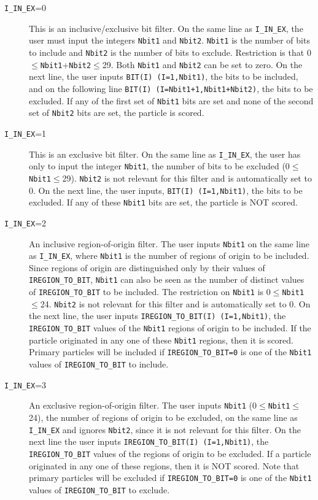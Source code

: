 \documentclass[12pt,twoside]{article}
\begin{document}
\begin{description}
\item [{\tt I\_IN\_EX}=0] This is an inclusive/exclusive bit filter.  On the
same line as {\tt I\_IN\_EX}, the user must input the integers {\tt Nbit1} and
{\tt Nbit2}.  {\tt Nbit1} is the number of bits to include and {\tt Nbit2} is
the number of bits to exclude.  Restriction is that
0$\leq${\tt Nbit1}+{\tt Nbit2}$\leq$29.
Both {\tt Nbit1} and {\tt Nbit2} can be set to zero.  On the next line, the
user inputs {\tt BIT(I) (I=1,Nbit1)}, the bits to be included, and on
the following line {\tt BIT(I) (I=Nbit1+1,Nbit1+Nbit2)}, the bits to
be excluded.  If any of the first set of {\tt Nbit1} bits are set and none
of the second set of {\tt Nbit2} bits are set, the particle is scored.

\item [{\tt I\_IN\_EX}=1] This is an exclusive bit filter.  On the same line
as {\tt I\_IN\_EX}, the user has only to input the integer {\tt Nbit1}, the
number of bits to be excluded (0$\leq${\tt Nbit1}$\leq$29).  {\tt Nbit2} is
not relevant for this filter and is automatically set to 0.  On the
next line, the user inputs, {\tt BIT(I) (I=1,Nbit1)}, the bits to
be excluded.  If any of these {\tt Nbit1} bits are set, the particle
is NOT scored.

\item [{\tt I\_IN\_EX}=2] An inclusive region-of-origin filter.
The user inputs {\tt Nbit1} on the same line
as {\tt I\_IN\_EX}, where {\tt Nbit1} is the number of regions of origin
to be included.  Since regions of origin are distinguished only by their
values of {\tt IREGION\_TO\_BIT}, {\tt Nbit1} can also be seen as the
number of distinct values of {\tt IREGION\_TO\_BIT} to be included. The
restriction on {\tt Nbit1} is 0$\leq${\tt Nbit1}$\leq$24.  {\tt Nbit2} is
not relevant for this filter and is automatically set to 0.  On the
next line, the user inputs {\tt IREGION\_TO\_BIT(I) (I=1,Nbit1)}, the
{\tt IREGION\_TO\_BIT} values of the {\tt Nbit1} regions of origin to
be included.  If the particle originated in any one of these {\tt Nbit1}
regions, then it is scored.  Primary particles will be included if
{\tt IREGION\_TO\_BIT=0} is one of the {\tt Nbit1} values of
{\tt IREGION\_TO\_BIT} to include.

\item [{\tt I\_IN\_EX}=3] An exclusive region-of-origin filter.
The user inputs {\tt Nbit1} (0$\leq${\tt Nbit1}$\leq$24), the number of
regions of origin to be excluded, on the same line as {\tt I\_IN\_EX} and
ignores {\tt Nbit2}, since it is not relevant for this filter.  On the
next line the user inputs {\tt IREGION\_TO\_BIT(I) (I=1,Nbit1)}, the
{\tt IREGION\_TO\_BIT} values of the regions of origin to be excluded.
If a particle originated in any one of these regions, then it is NOT
scored.  Note that primary particles will be excluded if
{\tt IREGION\_TO\_BIT=0} is one of the {\tt Nbit1} values of
{\tt IREGION\_TO\_BIT} to exclude.

\end{description}
\end{document}

